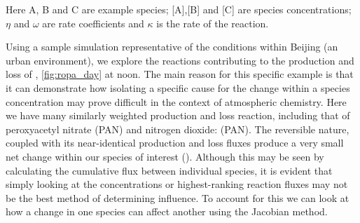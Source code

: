 Here A, B and C are example species; [A],[B] and [C] are species concentrations; $\eta$ and $\omega$ are rate coefficients and $\kappa$ is the rate of the reaction.  

Using a sample simulation representative of the conditions within Beijing (an urban environment), we explore the reactions contributing to the production and loss of ,
\autoref{fig:ropa_day} at noon. The main reason for this specific example is that it can demonstrate how isolating a specific cause for the change within a species concentration may prove difficult in the context of atmospheric chemistry. Here we have many similarly weighted production and loss reaction, including that of peroxyacetyl nitrate (PAN) and nitrogen dioxide: 
 (PAN). The reversible nature, coupled with its near-identical production and loss fluxes produce a very small net change within our species of interest (). Although this may be seen by calculating the cumulative flux between individual species, it is evident that simply looking at the concentrations or highest-ranking reaction fluxes may not be the best method of determining influence. To account for this we can look at how a change in one species can affect another using the Jacobian method.


